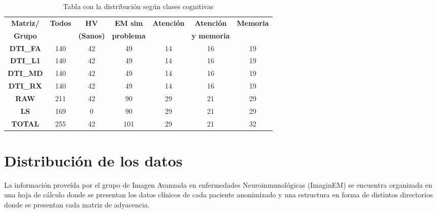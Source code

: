 \begin{table}[h]
\centering
\begin{tabular}{|c|c|c|c|c|c|c|}
\hline
\textbf{Matriz/} & \textbf{Todos} & \textbf{HV} & \textbf{EM sim} & \textbf{Atención} & \textbf{Atención} & \textbf{Memoria} \\
\textbf{Grupo} &  & \textbf{(Sanos)} & \textbf{problema} & \textbf{} & \textbf{y memoria} & \textbf{} \\ \hline
\textbf{DTI\_FA}      & 140            & 42                  & 49                       & 14                & 16                          & 19               \\ \hline
\textbf{DTI\_L1}      & 140            & 42                  & 49                       & 14                & 16                          & 19               \\ \hline
\textbf{DTI\_MD}      & 140            & 42                  & 49                       & 14                & 16                          & 19               \\ \hline
\textbf{DTI\_RX}      & 140            & 42                  & 49                       & 14                & 16                          & 19               \\ \hline
\textbf{RAW}          & 211            & 42                  & 90                       & 29                & 21                          & 29               \\ \hline
\textbf{LS}           & 169            & 0                   & 90                       & 29                & 21                          & 29               \\ \hline
\textbf{TOTAL}        & 255            & 42                  & 101                      & 29                & 21                          & 32               \\ \hline
\end{tabular}
\label{table:totales}
\caption{Tabla con la distribución según clases cognitivas}

\end{table}

\section{Distribución de los datos}
\label{section:distdatos}

La información proveída por el grupo de Imagen Avanzada en enfermedades Neuroinmunológicas (ImaginEM) \cite{QueNeuroinmunologia} se encuentra organizada en una hoja de cálculo donde se presentan los datos clínicos de cada paciente anonimizado y una estructura en forma de distintos directorios donde se presentan cada matriz de adyacencia.

